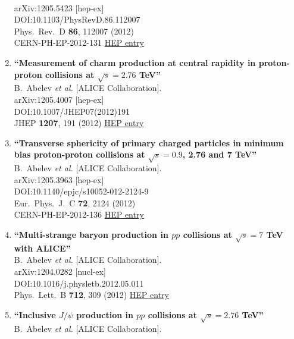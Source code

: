 \begin{enumerate}
  \\{}arXiv:1205.5423 [hep-ex]
  \\{}DOI:10.1103/PhysRevD.86.112007
  \\{}Phys.\ Rev.\ D {\bf 86}, 112007 (2012)
  \\{}CERN-PH-EP-2012-131
\href{http://inspirehep.net/record/1115824}{HEP entry}
\item%
{\bf ``Measurement of charm production at central rapidity in proton-proton collisions at $\sqrt{s}=2.76$ TeV''}
  \\{}B.~Abelev {\it et al.} [ALICE Collaboration].
  \\{}arXiv:1205.4007 [hep-ex]
  \\{}DOI:10.1007/JHEP07(2012)191
  \\{}JHEP {\bf 1207}, 191 (2012)
\href{http://inspirehep.net/record/1115187}{HEP entry}
\item%
{\bf ``Transverse sphericity of primary charged particles in minimum bias proton-proton collisions at $\sqrt{s}=0.9$, 2.76 and 7 TeV''}
  \\{}B.~Abelev {\it et al.} [ALICE Collaboration].
  \\{}arXiv:1205.3963 [hep-ex]
  \\{}DOI:10.1140/epjc/s10052-012-2124-9
  \\{}Eur.\ Phys.\ J.\ C {\bf 72}, 2124 (2012)
  \\{}CERN-PH-EP-2012-136
\href{http://inspirehep.net/record/1115186}{HEP entry}
\item%
{\bf ``Multi-strange baryon production in $pp$ collisions at $\sqrt{s} = 7$ TeV with ALICE''}
  \\{}B.~Abelev {\it et al.} [ALICE Collaboration].
  \\{}arXiv:1204.0282 [nucl-ex]
  \\{}DOI:10.1016/j.physletb.2012.05.011
  \\{}Phys.\ Lett.\ B {\bf 712}, 309 (2012)
\href{http://inspirehep.net/record/1097057}{HEP entry}
\item%
{\bf ``Inclusive $J/\psi$ production in $pp$ collisions at $\sqrt{s} = 2.76$ TeV''}
  \\{}B.~Abelev {\it et al.} [ALICE Collaboration].

\end{enumerate}
